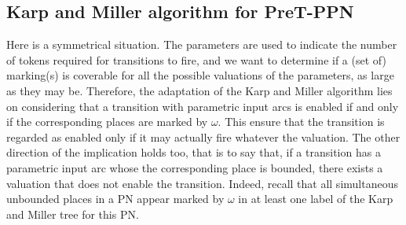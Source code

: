 \subsection{Karp and Miller algorithm for PreT-\ac{PPN}}

Here is a symmetrical situation.
The parameters are used to indicate the number of tokens required for transitions to fire, and we want to determine if a (set of) marking(s) is coverable for all the possible valuations of the parameters, as large as they may be.
Therefore, the adaptation of the Karp and Miller algorithm lies on considering that a transition with parametric input arcs is enabled if and only if the corresponding places are marked by $\omega$.
This ensure that the transition is regarded as enabled only if it may actually fire whatever the valuation.
The other direction of the implication holds too, that is to say that, if a transition has a parametric input arc whose the corresponding place is bounded, there exists a valuation that does not enable the transition.
Indeed, recall that all simultaneous unbounded places in a \ac{PN} appear marked by $\omega$ in at least one label of the Karp and Miller tree for this \ac{PN}.

